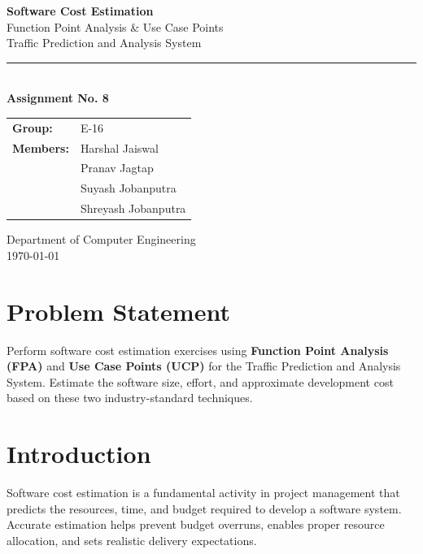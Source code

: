 \documentclass[12pt,a4paper]{article}
\begin{document}
\begin{titlepage}
\centering
\vspace*{2cm}
{\Huge\bfseries\color{headblue} Software Cost Estimation\\[12pt]}
{\LARGE Function Point Analysis \& Use Case Points\\[8pt]}
{\large Traffic Prediction and Analysis System\\[20pt]}
\rule{0.6\textwidth}{1pt}\\[20pt]

{\large\textbf{Assignment No. 8}}\\[30pt]

\begin{tabular}{ll}
\textbf{Group:} & E-16 \\[4pt]
\textbf{Members:} & Harshal Jaiswal \\
 & Pranav Jagtap \\
 & Suyash Jobanputra \\
 & Shreyash Jobanputra \\
\end{tabular}

\vfill
{\small Department of Computer Engineering\\
\today}
\end{titlepage}

\section{Problem Statement}
Perform software cost estimation exercises using \textbf{Function Point Analysis (FPA)} and \textbf{Use Case Points (UCP)} for the Traffic Prediction and Analysis System. Estimate the software size, effort, and approximate development cost based on these two industry-standard techniques.

\section{Introduction}
Software cost estimation is a fundamental activity in project management that predicts the resources, time, and budget required to develop a software system. Accurate estimation helps prevent budget overruns, enables proper resource allocation, and sets realistic delivery expectations.
\end{document}
